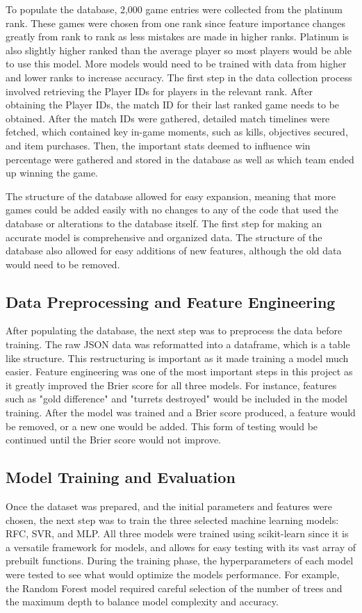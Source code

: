 \documentclass[10pt,twocolumn]{article}
\begin{document}
To populate the database, 2,000 game entries were collected from the platinum rank. These games were chosen from one rank since feature importance changes greatly from rank to rank as less mistakes are made in higher ranks. Platinum is also slightly higher ranked than the average player so most players would be able to use this model. More models would need to be trained with data from higher and lower ranks to increase accuracy. The first step in the data collection process involved retrieving the Player IDs for players in the relevant rank. After obtaining the Player IDs, the match ID for their last ranked game needs to be obtained. After  the match IDs were gathered, detailed match timelines were fetched, which contained key in-game moments, such as kills, objectives secured, and item purchases. Then, the important stats deemed to influence win percentage were gathered and stored in the database as well as which team ended up winning the game.

The structure of the database allowed for easy expansion, meaning that more games could be added easily with no changes to any of the code that used the database or alterations to the database itself. The first step for making an accurate model is comprehensive and organized data. The structure of the database also allowed for easy additions of new features, although the old data would need to be removed.

\subsection{Data Preprocessing and Feature Engineering}
After populating the database, the next step was to preprocess the data before training. The raw JSON data was reformatted into a dataframe, which is a table like structure. This restructuring is important as it made training a model much easier.
Feature engineering was one of the most important steps in this project as it greatly improved the Brier score for all three models. For instance, features such as "gold difference" and "turrets destroyed" would be included in the model training. After the model was trained and a Brier score produced, a feature would be removed, or a new one would be added. This form of testing would be continued until the Brier score would not improve. 
\subsection{Model Training and Evaluation}
Once the dataset was prepared, and the initial parameters and features were chosen, the next step was to train the three selected machine learning models: RFC, SVR, and MLP. All three models were trained using scikit-learn since it is a versatile framework for models, and allows for easy testing with its vast array of prebuilt functions. During the training phase, the hyperparameters of each model were tested to see what would optimize the models performance. For example, the Random Forest model required careful selection of the number of trees and the maximum depth to balance model complexity and accuracy. 
\end{document}
